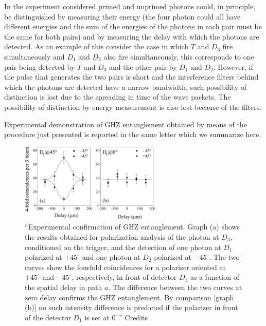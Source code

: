 In the experiment considered primed and unprimed photons could, in principle, be distinguished by measuring their energy (the four photon could all have different energies and the sum of the energies of the photons in each pair must be the same for both pairs) and by measuring the delay with which the photons are detected. As an example of this consider the case in which $T$ and $D_3$ fire simultaneously and $D_1$ and $D_2$ also fire simultaneously, this corresponds to one pair being detected by $T$ and $D_3$ and the other pair by $D_1$ and $D_2$. However, if the pulse that generates the two pairs is short and the interference filters behind which the photons are detected have a narrow bandwidth, such possibility of distinction is lost due to the spreading in time of the wave packets. The possibility of distinction by energy measurement is also lost because of the filters.

Experimental demonstration of GHZ entanglement obtained by means of the procedure just presented is reported in the same letter \cite{PhysRevLett.82.1345} which we summarize here.%

\begin{figure}
  \centering
  \includegraphics[width=0.6\textwidth]{Mainmatter/Chapter3/ghz-entanglement-exp-proof.png}
  \caption{``Experimental confirmation of GHZ entanglement. Graph (a) shows the results obtained for polarization analysis of the photon at $D_3$, conditioned on the trigger, and the detection of one photon at $D_1$ polarized at $+ 45^\circ$ and one photon at $D_2$ polarized at $- 45^\circ$. The two curves show the fourfold coincidences for a polarizer oriented at $+ 45^\circ$ and $- 45^\circ$, respectively, in front of detector $D_3$ as a function of the spatial delay in path $a$. The difference between the two curves at zero delay confirms the GHZ entanglement. By comparison [graph (b)] no such intensity difference is predicted if the polarizer in front of the detector $D_1$ is set at $0^\circ$.'' Credits \cite{PhysRevLett.82.1345}.}
  \label{fig:ghz-entanglement-exp-proof}
\end{figure}

